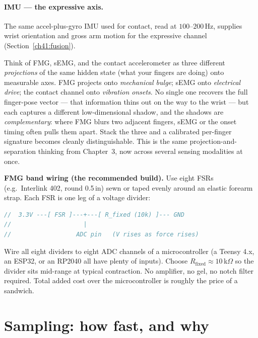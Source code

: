 \paragraph{IMU --- the expressive axis.} The same accel-plus-gyro IMU used for
contact, read at $100$--$200\,$Hz, supplies wrist orientation and gross arm
motion for the expressive channel (Section~\ref{ch41:fusion}).

\begin{intuitionbox}
Think of FMG, sEMG, and the contact accelerometer as three different
\emph{projections} of the same hidden state (what your fingers are doing) onto
measurable axes. FMG projects onto \emph{mechanical bulge}; sEMG onto
\emph{electrical drive}; the contact channel onto \emph{vibration onsets}. No
single one recovers the full finger-pose vector --- that information thins out on
the way to the wrist --- but each captures a different low-dimensional shadow,
and the shadows are \emph{complementary}: where FMG blurs two adjacent fingers,
sEMG or the onset timing often pulls them apart. Stack the three and a calibrated
per-finger signature becomes cleanly distinguishable. This is the same
projection-and-separation thinking from Chapter~3, now across
several sensing modalities at once.
\end{intuitionbox}

\begin{buildbox}
\textbf{FMG band wiring (the recommended build).} Use eight FSRs (e.g.\
Interlink 402, round 0.5\,in) sewn or taped evenly around an elastic forearm
strap. Each FSR is one leg of a voltage divider:

\begin{lstlisting}[language=C]
//  3.3V ---[ FSR ]---+---[ R_fixed (10k) ]--- GND
//                    |
//                  ADC pin   (V rises as force rises)
\end{lstlisting}

Wire all eight dividers to eight ADC channels of a microcontroller (a Teensy
4.x, an ESP32, or an RP2040 all have plenty of inputs). Choose
$R_{\text{fixed}}\approx 10\,$k$\Omega$ so the divider sits mid-range at typical
contraction. No amplifier, no gel, no notch filter required. Total added cost
over the microcontroller is roughly the price of a sandwich.
\end{buildbox}

\section{Sampling: how fast, and why}
\label{ch41:sampling}

